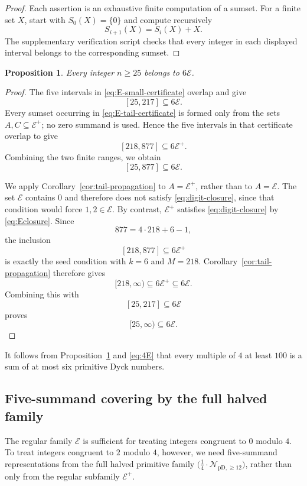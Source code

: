 \documentclass[12pt]{article}
\theoremstyle{plain}
\newtheorem{proposition}[theorem]{Proposition}
\theoremstyle{definition}
\theoremstyle{plain}
\newcommand{\Pset}{%
  \bigl(\tfrac{1}{4}\cdot\mathcal{N}_{\mathrm{pD},\geq 12}\bigr)%
}
\begin{document}
\begin{proof}
Each assertion is an exhaustive finite computation of a sumset.  For a
finite set $X$, start with $S_0(X)=\{0\}$ and compute recursively
\[
 S_{i+1}(X)=S_i(X)+X.
\]
The supplementary verification script checks that every integer in each
displayed interval belongs to the corresponding sumset.
\end{proof}

\begin{proposition}\label{prop:E}
Every integer $n\geq25$ belongs to $6\mathcal E$.
\end{proposition}

\begin{proof}
The five intervals in \eqref{eq:E-small-certificate} overlap and give
\[
 [25,217]\subseteq6\mathcal E.
\]
Every sumset occurring in \eqref{eq:E-tail-certificate} is formed only
from the sets $A,C\subseteq\mathcal E^+$; no zero summand is used.
Hence the five intervals in that certificate overlap to give
\[
 [218,877]\subseteq6\mathcal E^+.
\]
Combining the two finite ranges, we obtain
\begin{equation}\label{eq:E-small-cover}
 [25,877]\subseteq6\mathcal E.
\end{equation}

We apply Corollary~\ref{cor:tail-propagation} to
$A=\mathcal E^+$, rather than to $A=\mathcal E$.  The set
$\mathcal E$ contains $0$ and therefore does not satisfy
\eqref{eq:digit-closure}, since that condition would force
$1,2\in\mathcal E$.  By contrast, $\mathcal E^+$ satisfies
\eqref{eq:digit-closure} by \eqref{eq:Eclosure}.  Since
\[
 877=4\cdot218+6-1,
\]
the inclusion
\[
 [218,877]\subseteq6\mathcal E^+
\]
is exactly the seed condition with $k=6$ and $M=218$.
Corollary~\ref{cor:tail-propagation} therefore gives
\[
 [218,\infty)\subseteq6\mathcal E^+\subseteq6\mathcal E.
\]
Combining this with
\[
 [25,217]\subseteq6\mathcal E
\]
proves
\[
 [25,\infty)\subseteq6\mathcal E.
\]
\end{proof}

It follows from Proposition~\ref{prop:E} and \eqref{eq:4E} that every
multiple of $4$ at least $100$ is a sum of at most six primitive Dyck
numbers.

\subsection{Five-summand covering by the full halved family}

The regular family $\mathcal E$ is sufficient for treating integers
congruent to $0$ modulo $4$.  To treat integers congruent to $2$
modulo $4$, however, we need five-summand representations from the full
halved primitive family $\Pset$, rather than only from the regular
subfamily $\mathcal E^+$.
\end{document}
